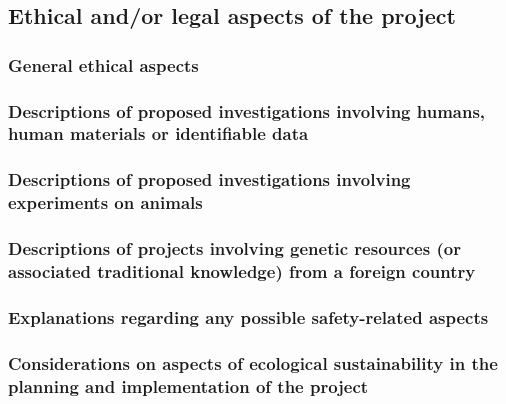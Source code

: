 \documentclass{scrartcl}
\begin{document}
\subsection{Ethical and/or legal aspects of the project}

\subsubsection{General ethical aspects}

\subsubsection{Descriptions of proposed investigations involving humans, human materials or identifiable data}

\subsubsection{Descriptions of proposed investigations involving experiments on animals}

\subsubsection{Descriptions of projects involving genetic resources (or associated traditional knowledge) from a foreign country}

\subsubsection{Explanations regarding any possible safety-related aspects}



\subsubsection{Considerations on aspects of ecological sustainability in the planning and implementation of the project}

\end{document}
